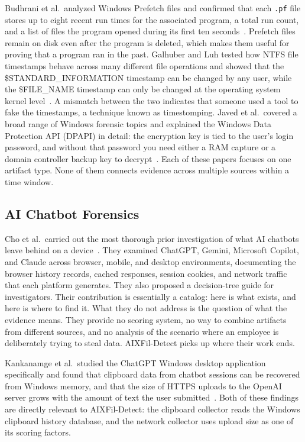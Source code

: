 \documentclass[conference]{IEEEtran}
\begin{document}
Budhrani et al.\ analyzed Windows Prefetch files and confirmed that
each \texttt{.pf} file stores up to eight recent run times for the
associated program, a total run count, and a list of files the program
opened during its first ten seconds~\cite{budhrani2022prefetch}.
Prefetch files remain on disk even after the program is deleted, which
makes them useful for proving that a program ran in the past. Galhuber
and Luh tested how NTFS file timestamps behave across many different
file operations and showed that the \$STANDARD\_INFORMATION timestamp
can be changed by any user, while the \$FILE\_NAME timestamp can only
be changed at the operating system kernel level~\cite{galhuber2021ntfs}.
A mismatch between the two indicates that someone used a tool to fake
the timestamps, a technique known as timestomping. Javed et al.\
covered a broad range of Windows forensic topics and explained the
Windows Data Protection API (DPAPI) in detail: the encryption key is
tied to the user's login password, and without that password you need
either a RAM capture or a domain controller backup key to
decrypt~\cite{javed2022survey}. Each of these papers focuses on one
artifact type. None of them connects evidence across multiple sources
within a time window.

\subsection{AI Chatbot Forensics}

Cho et al.\ carried out the most thorough prior investigation of what
AI chatbots leave behind on a device~\cite{cho2025conversational}. They
examined ChatGPT, Gemini, Microsoft Copilot, and Claude across browser,
mobile, and desktop environments, documenting the browser history
records, cached responses, session cookies, and network traffic that
each platform generates. They also proposed a decision-tree guide for
investigators. Their contribution is essentially a catalog: here is
what exists, and here is where to find it. What they do not address is
the question of what the evidence means. They provide no scoring system,
no way to combine artifacts from different sources, and no analysis of
the scenario where an employee is deliberately trying to steal data.
AIXFil-Detect picks up where their work ends.

Kankanamge et al.\ studied the ChatGPT Windows desktop application
specifically and found that clipboard data from chatbot sessions can
be recovered from Windows memory, and that the size of HTTPS uploads
to the OpenAI server grows with the amount of text the user
submitted~\cite{kankanamge2025chatgpt}. Both of these findings are
directly relevant to AIXFil-Detect: the clipboard collector reads the
Windows clipboard history database, and the network collector uses
upload size as one of its scoring factors.
\end{document}
